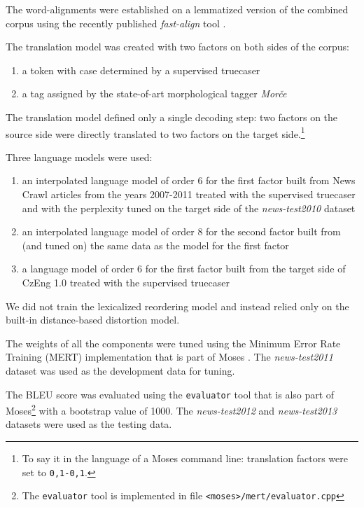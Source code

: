 The word-alignments were established on a lemmatized version of the combined corpus using
the recently published \emph{fast-align} tool \citep{dyer:fastalign}.

The translation model was created with two factors on both sides of the corpus:
\begin{enumerate}
  \item a token with case determined by a supervised truecaser
  \item a tag assigned by the state-of-art morphological tagger \emph{Morče}
\end{enumerate}

The translation model defined only a single decoding step: two factors on the source side
were directly translated to two factors on the target side.\footnote{To say it in the language
of a Moses command line: translation factors were set to \texttt{0,1-0,1}.}

Three language models were used:
\begin{enumerate}
  \item an interpolated language model of order 6 for the first factor built from News Crawl
    articles from the years 2007-2011 treated with the supervised truecaser and with the perplexity tuned
    on the target side of the \emph{news-test2010} dataset
  \item an interpolated language model of order 8 for the second factor built from (and tuned
    on) the same data as the model for the first factor
  \item a language model of order 6 for the first factor built from the target side of CzEng 1.0
    treated with the supervised truecaser
\end{enumerate}

We did not train the lexicalized reordering model and instead relied only on the built-in
distance-based distortion model.

The weights of all the components were tuned using the Minimum Error Rate Training (MERT)
implementation that is part of Moses \citep{bertoldi:mert}.
The \emph{news-test2011} dataset was used as the development data for tuning.

The BLEU score was evaluated using the \texttt{evaluator} tool that is also part of
Moses\footnote{The \texttt{evaluator} tool is implemented in file \texttt{<moses>/mert/evaluator.cpp}}
with a bootstrap value of 1000.
The \emph{news-test2012} and \emph{news-test2013} datasets were used as the testing data.

